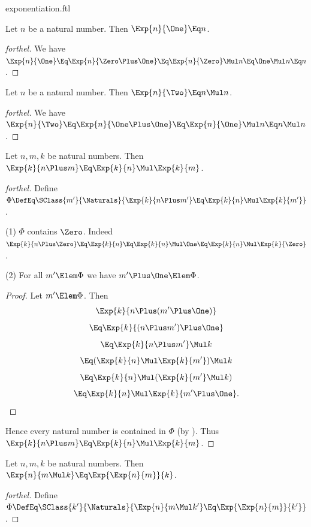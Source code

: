\documentclass{stex}
\begin{document}
\begin{smodule}{exponentiation.ftl}
\begin{proposition*}[forthel]
  Let $n$ be a natural number.
  Then $\Exp{n}{\One} \Eq n$.
\end{proposition*}
\begin{proof}[forthel]
  We have $\Exp{n}{\One}
    \Eq \Exp{n}{\Zero \Plus \One}
    \Eq \Exp{n}{\Zero} \Mul n
    \Eq \One \Mul n
    \Eq n$.
\end{proof}

\begin{proposition*}[forthel]
  Let $n$ be a natural number.
  Then $\Exp{n}{\Two} \Eq n \Mul n$.
\end{proposition*}
\begin{proof}[forthel]
  We have $\Exp{n}{\Two}
    \Eq \Exp{n}{\One \Plus \One}
    \Eq \Exp{n}{\One} \Mul n
    \Eq n \Mul n$.
\end{proof}

\begin{proposition*}[forthel]
  Let $n, m, k$ be natural numbers.
  Then $\Exp{k}{n \Plus m} \Eq \Exp{k}{n} \Mul \Exp{k}{m}$.
\end{proposition*}
\begin{proof}[forthel]
  Define $\Phi \DefEq \SClass{m'}{\Naturals}{\Exp{k}{n \Plus m'} \Eq \Exp{k}{n} \Mul \Exp{k}{m'}}$.

  (1) $\Phi$ contains $\Zero$.
  Indeed $\Exp{k}{n \Plus \Zero}
    \Eq \Exp{k}{n}
    \Eq \Exp{k}{n} \Mul \One
    \Eq \Exp{k}{n} \Mul \Exp{k}{\Zero}$.

  (2) For all $m' \Elem \Phi$ we have $m' \Plus \One \Elem \Phi$.
  \begin{proof}
    Let $m' \Elem \Phi$.
    Then
    \[  \Exp{k}{n \Plus (m' \Plus \One)}                  \]
    \[    \Eq \Exp{k}{(n \Plus m') \Plus \One}              \]
    \[    \Eq \Exp{k}{n \Plus m'} \Mul k            \]
    \[    \Eq (\Exp{k}{n} \Mul \Exp{k}{m'}) \Mul k  \]
    \[    \Eq \Exp{k}{n} \Mul (\Exp{k}{m'} \Mul k)  \]
    \[    \Eq \Exp{k}{n} \Mul \Exp{k}{m' \Plus \One}.       \]
  \end{proof}

  Hence every natural number is contained in $\Phi$ (by ).
  Thus $\Exp{k}{n \Plus m} \Eq \Exp{k}{n} \Mul \Exp{k}{m}$.
\end{proof}

\begin{proposition*}[forthel]
  Let $n, m, k$ be natural numbers.
  Then $\Exp{n}{m \Mul k} \Eq \Exp{\Exp{n}{m}}{k}$.
\end{proposition*}
\begin{proof}[forthel]
  Define $\Phi \DefEq \SClass{k'}{\Naturals}{\Exp{n}{m \Mul k'} \Eq \Exp{\Exp{n}{m}}{k'}}$.


\end{proof}
\end{smodule}
\end{document}
